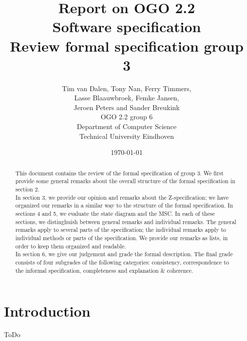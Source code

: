 \documentclass[a4paper,11pt]{article}
\title{Report on OGO 2.2 \\ Software specification\\ Review formal specification group 3}
\author{
        Tim van Dalen, Tony Nan, Ferry Timmers, \\ Lasse Blaauwbroek, Femke Jansen, \\Jeroen Peters and Sander Breukink\\ OGO 2.2 group 6 \\
                Department of Computer Science\\
        Technical University Eindhoven\\
}
\date{\today}
\begin{document}
\maketitle

\begin{abstract}
This document contains the review of the formal specification of group 3. We first provide some general remarks about the overall structure of the formal specification in section 2. \\ 
In section 3, we provide our opinion and remarks about the Z-specification; we have organized our remarks in a similar way to the structure of the formal specification. In sections 4 and 5, we evaluate the state diagram and the MSC. In each of these sections, we distinghuish between general remarks and individual remarks. The general remarks apply to several parts of the specification; the individual remarks apply to individual methods or parts of the specification. We provide our remarks as lists, in order to keep them organized and readable. \\
In section 6, we give our judgement and grade the formal description. The final grade consists of four subgrades of the following categories: consistency, correspondence to the informal specification, completeness and explanation \& coherence. 
\end{abstract}

\newpage
	
	\tableofcontents
	\newpage
    
    \section{Introduction}
    ToDo	
\end{document}
